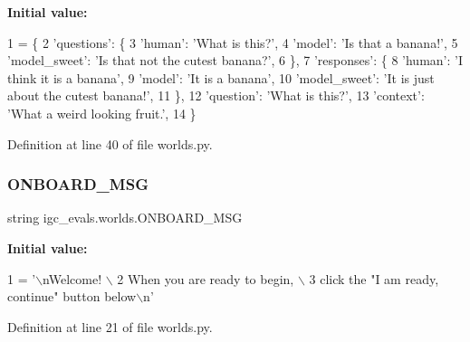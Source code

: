 {\bfseries Initial value\+:}
\begin{DoxyCode}
1 =  \{
2     \textcolor{stringliteral}{'questions'}: \{
3         \textcolor{stringliteral}{'human'}: \textcolor{stringliteral}{'What is this?'},
4         \textcolor{stringliteral}{'model'}: \textcolor{stringliteral}{'Is that a banana!'},
5         \textcolor{stringliteral}{'model\_sweet'}: \textcolor{stringliteral}{'Is that not the cutest banana?'},
6     \},
7     \textcolor{stringliteral}{'responses'}: \{
8         \textcolor{stringliteral}{'human'}: \textcolor{stringliteral}{'I think it is a banana'},
9         \textcolor{stringliteral}{'model'}: \textcolor{stringliteral}{'It is a banana'},
10         \textcolor{stringliteral}{'model\_sweet'}: \textcolor{stringliteral}{'It is just about the cutest banana!'},
11     \},
12     \textcolor{stringliteral}{'question'}: \textcolor{stringliteral}{'What is this?'},
13     \textcolor{stringliteral}{'context'}: \textcolor{stringliteral}{'What a weird looking fruit.'},
14 \}
\end{DoxyCode}


Definition at line 40 of file worlds.\+py.

\mbox{\label{namespaceigc__evals_1_1worlds_a00b7c310f5d42cfd2a0f4efe4797fed9}} 
\subsubsection{\texorpdfstring{O\+N\+B\+O\+A\+R\+D\+\_\+\+M\+SG}{ONBOARD\_MSG}}
{\footnotesize\ttfamily string igc\+\_\+evals.\+worlds.\+O\+N\+B\+O\+A\+R\+D\+\_\+\+M\+SG}

{\bfseries Initial value\+:}
\begin{DoxyCode}
1 =  \textcolor{stringliteral}{'\(\backslash\)nWelcome! \(\backslash\)}
2 \textcolor{stringliteral}{        When you are ready to begin, \(\backslash\)}
3 \textcolor{stringliteral}{        click the "I am ready, continue" button below\(\backslash\)n'}
\end{DoxyCode}


Definition at line 21 of file worlds.\+py.

\mbox{\label{namespaceigc__evals_1_1worlds_a7c258f12cbeeba1890e94f560a4d9ea5}} 
